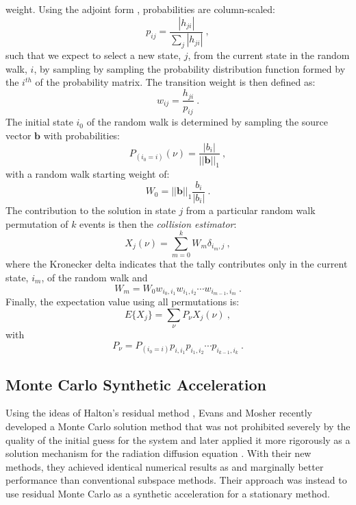 \documentclass{snamc2013}
\begin{document}
weight. Using the adjoint form \cite{spanier_monte_1969},
probabilities are column-scaled:
\begin{equation}
  p_{ij} = \frac{|h_{ji}|}{\sum_j |h_{ji}|}\:,
  \label{eq:adjoint_probability}
\end{equation}
such that we expect to select a new state, $j$, from the current state
in the random walk, $i$, by sampling by sampling the probability
distribution function formed by the $i^{th}$ of the probability
matrix. The transition weight is then defined as:
\begin{equation}
  w_{ij} = \frac{h_{ji}}{p_{ij}}\:.
  \label{eq:adjoint_weight}
\end{equation}
The initial state $i_0$ of the random walk is determined by sampling
the source vector $\mathbf{b}$ with probabilities:
\begin{equation}
  P_{(i_0=i)}(\nu) = \frac{|b_i|}{||\mathbf{b}||_1}\:,
  \label{eq:adjoint_source_probability}
\end{equation}
with a random walk starting weight of:
\begin{equation}
  W_0 = ||\mathbf{b}||_1 \frac{b_i}{|b_i|}\:.
  \label{eq:adjoint_starting_weight}
\end{equation}
The contribution to the solution in state $j$ from a particular random
walk permutation of $k$ events is then the \textit{collision
  estimator}:
\begin{equation}
  X_{j}(\nu) = \sum_{m=0}^k W_{m} \delta_{i_m,j}\:,
  \label{eq:adjoint_permutation_contribution}
\end{equation}
where the Kronecker delta indicates that the tally contributes only in
the current state, $i_m$, of the random walk and 
\begin{equation}
  W_{m} = W_0 w_{i_0,i_1} w_{i_1,i_2} \cdots w_{i_{m-1},i_m}\:.
  \label{eq:adjoint_permutation_weight}
\end{equation}
Finally, the expectation value using all permutations is:
\begin{equation}
  E\{X_j\} = \sum_{\nu} P_{\nu} X_{j}(\nu)\:,
  \label{eq:adjoint_expectation_value}
\end{equation}
with
\begin{equation}
  P_{\nu} = P_{(i_0=i)} p_{i,i_1} p_{i_1,i_2} \cdots p_{i_{k-1},i_k}\:.
  \label{eq:adjoint_permutation_probability}
\end{equation}

\subsection{Monte Carlo Synthetic Acceleration}
Using the ideas of Halton's residual method
\cite{halton_sequential_1994}, Evans and Mosher recently developed a
Monte Carlo solution method that was not prohibited severely by the
quality of the initial guess for the system \cite{evans_monte_2009}
and later applied it more rigorously as a solution mechanism for the
radiation diffusion equation \cite{evans_monte_2012}. With their new
methods, they achieved identical numerical results as and marginally
better performance than conventional subspace methods. Their approach
was instead to use residual Monte Carlo as a synthetic acceleration
for a stationary method. 
\end{document}
